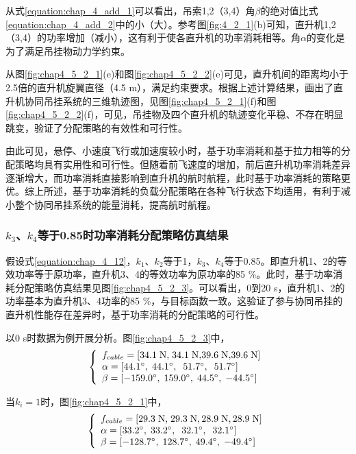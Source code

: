 从式\ref{equation:chap_4_add_1}可以看出，吊索1,2（3,4）角$\beta$的绝对值比式\ref{equation:chap_4_add_2}中的小（大）。参考图\ref{fig:4_2_1}(b)可知，直升机1,2（3,4）的功率增加（减小），这有利于使各直升机的功率消耗相等。角$\alpha$的变化是为了满足吊挂物动力学约束。

从图\ref{fig:chap4_5_2_1}(e)和图\ref{fig:chap4_5_2_2}(e)可见，直升机间的距离均小于2.5倍的直升机旋翼直径（4.5 m），满足约束要求。根据上述计算结果，画出了直升机协同吊挂系统的三维轨迹图，见图\ref{fig:chap4_5_2_1}(f)和图\ref{fig:chap4_5_2_2}(f)，可见，吊挂物及四个直升机的轨迹变化平稳、不存在明显跳变，验证了分配策略的有效性和可行性。

由此可见，悬停、小速度飞行或加速度较小时，基于功率消耗和基于拉力相等的分配策略均具有实用性和可行性。但随着前飞速度的增加，前后直升机功率消耗差异逐渐增大，而功率消耗直接影响到直升机的航时航程，此时基于功率消耗的策略更优。综上所述，基于功率消耗的负载分配策略在各种飞行状态下均适用，有利于减小整个协同吊挂系统的能量消耗，提高航时航程。

\subsubsection{$k_3$、$k_4$等于0.85时功率消耗分配策略仿真结果}
假设式\ref{equation:chap_4_12}，$k_1$、$k_2$等于1，$k_3$、$k_4$等于0.85。即直升机1、2的等效功率等于原功率，直升机3、4的等效功率为原功率的85 \%。此时，基于功率消耗分配策略仿真结果见图\ref{fig:chap4_5_2_3}。可以看出，0到20 s，直升机1、2的功率基本为直升机3、4功率的85 \%，与目标函数一致。这验证了参与协同吊挂的直升机性能存在差异时，基于功率消耗的分配策略的可行性。

以0 s时数据为例开展分析。图\ref{fig:chap4_5_2_3}中，
\begin{equation}
  \left\{ \begin{array}{l}
    {f_{cable}} = \left[ {34.1\;{\rm{N,}}\;34.1\;{\rm{N, }}39.6\;{\rm{N, }}39.6\;{\rm{N}}} \right]\\
    \alpha  = \left[ {44.1^\circ ,\;44.1^\circ ,\;\;51.7^\circ ,\;\;51.7^\circ } \right]\\
    \beta  = \left[ { - 159.0^\circ ,\;159.0^\circ ,\;44.5^\circ ,\; - 44.5^\circ } \right]
    \end{array} \right.
\end{equation}

当$k_i = 1$时，图\ref{fig:chap4_5_2_1}中，
\begin{equation}
  \left\{ \begin{array}{l}
    {f_{cable}} = \left[ {29.3\;{\rm{N,}}\;29.3\;{\rm{N, 28}}{\rm{.9}}\;{\rm{N, 28}}{\rm{.9}}\;{\rm{N}}} \right]\\
    \alpha  = \left[ {33.2^\circ ,\;33.2^\circ ,\;\;32.1^\circ ,\;\;32.1^\circ } \right]\\
    \beta  = \left[ { - 128.7^\circ ,\;128.7^\circ ,\;49.4^\circ ,\; - 49.4^\circ } \right]
    \end{array} \right.
\end{equation}

